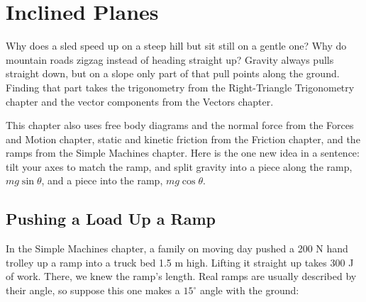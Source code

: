 \chapter{Inclined Planes}

Why does a sled speed up on a steep hill but sit still on a gentle one? Why do
mountain roads zigzag instead of heading straight up? Gravity always pulls
straight down, but on a slope only part of that pull points along the ground.
Finding that part takes the trigonometry from the Right-Triangle Trigonometry
chapter and the vector components from the Vectors chapter.

This chapter also uses free body diagrams and the normal force from the Forces and Motion
chapter, static and kinetic friction from the Friction chapter, and the ramps from the
Simple Machines chapter. Here is the one new
idea in a sentence: tilt your axes to match the ramp, and split gravity into a
piece along the ramp, $mg\sin\theta$, and a piece into the ramp, $mg\cos\theta$.

\section{Pushing a Load Up a Ramp}
In the Simple Machines chapter, a family on moving day pushed a 200 N hand trolley
up a ramp into a truck bed 1.5 m high. Lifting it straight up takes 300 J of work.
There, we knew the ramp's length. Real ramps are usually described by their angle,
so suppose this one makes a $15^\circ$ angle with the ground:

\begin{center}
\end{center}


